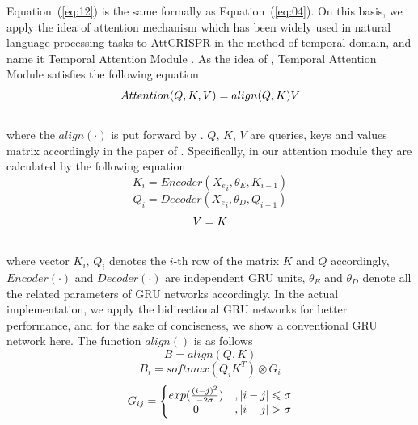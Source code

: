 \documentclass{bioinfo}
\begin{document}
Equation~(\ref{eq:12}) is the same formally as Equation~(\ref{eq:04}). 
On this basis, we apply the idea of attention mechanism which has been widely used in natural language processing tasks to AttCRISPR in the method of temporal domain, 
and name it Temporal Attention Module \citep{vaswani2017attention,luong2015effective,bahdanau2014neural}.
As the idea of \citeauthor{vaswani2017attention}, Temporal Attention Module satisfies the following equation
\begin{equation}
Attention(Q,K,V)=align(Q,K)V\label{eq:12}\vspace*{-10pt}
\end{equation}\\
where the $align(\cdot)$ is put forward by \citeauthor{luong2015effective}. 
$Q$, $K$, $V$ are queries, keys and values matrix accordingly in the paper of \citeauthor{vaswani2017attention}. 
Specifically, in our attention module they are calculated by the following equation
\begin{equation}
K_i=Encoder({X_e}_i,\theta_E,K_{i-1})\label{eq:13}
\end{equation}
\begin{equation}
Q_i=Decoder({X_e}_i,\theta_D,Q_{i-1})\label{eq:14}
\end{equation}
\begin{equation}
V=K\label{eq:15}\vspace*{-10pt}
\end{equation}\\
where vector $K_i$, $Q_i$ denotes the $i$-th row of the matrix $K$ and $Q$ accordingly, $Encoder(\cdot)$ and $Decoder(\cdot)$ are independent GRU units, $\theta_E$ and $\theta_D$ denote all the related parameters of GRU networks accordingly. 
In the actual implementation, we apply the bidirectional GRU networks for better performance, and for the sake of conciseness, we show a conventional GRU network here. 
The function $align()$ is as follows
\begin{equation}
B=align(Q,K)\label{eq:16}
\end{equation}
\begin{equation}
B_i=softmax(Q_iK^T)\otimes G_i\label{eq:17}
\end{equation}
\begin{equation}
G_{ij}=\left\{\begin{matrix}
exp(\frac{(i-j)^2}{-2\sigma})&,\left | i-j \right |\leqslant \sigma
\\ 0&,\left | i-j \right |>  \sigma
\end{matrix}\right.\label{eq:18}\vspace*{-10pt}
\end{equation}\\
\end{document}
